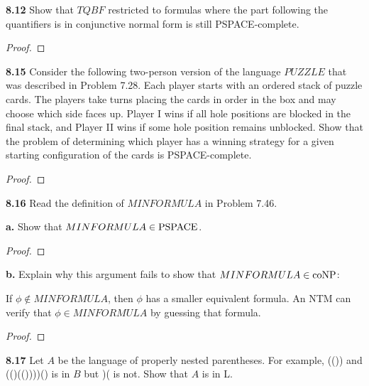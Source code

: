 \textbf{8.12} Show that $TQBF$ restricted to formulas where the part following the quantifiers is in conjunctive normal form is still PSPACE-complete.
\begin{mdframed}
\begin{proof}

\end{proof}
\end{mdframed}

\textbf{8.15} Consider the following two-person version of the language $PUZZLE$ that was described in Problem 7.28. Each player starts with an ordered stack of puzzle cards. The players take turns placing the cards in order in the box and may choose which
side faces up. Player I wins if all hole positions are blocked in the final stack, and
Player II wins if some hole position remains unblocked. Show that the problem of
determining which player has a winning strategy for a given starting configuration
of the cards is PSPACE-complete.
\begin{mdframed}
\begin{proof}

\end{proof}
\end{mdframed}

\textbf{8.16} Read the definition of $MINFORMULA$ in Problem 7.46.

\textbf{a.} Show that $MINFORMULA \in \text{PSPACE}$.
\begin{mdframed}
\begin{proof}

\end{proof}
\end{mdframed}

\textbf{b.} Explain why this argument fails to show that $MINFORMULA \in \text{coNP}$:

If $\phi \not \in MINFORMULA$, then $\phi$ has a smaller equivalent formula. An NTM
can verify that $\phi \in  MINFORMULA$ by guessing that formula.
\begin{mdframed}
\begin{proof}

\end{proof}
\end{mdframed}

\textbf{8.17} Let $A$ be the language of properly nested parentheses. For example, (()) and (()(())))() is in $B$ but )( is not. Show that $A$ is in L.


